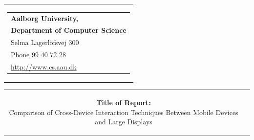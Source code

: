 


\begin{nopagebreak}
{\samepage

\begin{tabular}{r}
	\parbox{\textwidth}
	{  
		\hspace{3.7cm} \parbox{0cm}
		{
			\begin{tabular}{l}
			{\small \textbf{Aalborg University,}}\\
			{\small \textbf{Department of Computer Science}}\\
			
			{\small Selma Lagerlöfsvej 300} \\
			{\small Phone 99 40 72 28} \\
			{\small \url{http://www.cs.aau.dk}}
			\end{tabular}
		}
		\vspace{0cm}
	}
\end{tabular}

\begin{tabular}{cc}
\parbox{8cm}{
\vspace{1cm}
\begin{description}

\item {\textbf{Title of Report:}}\\ 
Comparison of Cross-Device Interaction Techniques Between Mobile Devices and Large Displays

\end{description}

\parbox{8cm}{

}}
\end{tabular}}
\end{nopagebreak}

